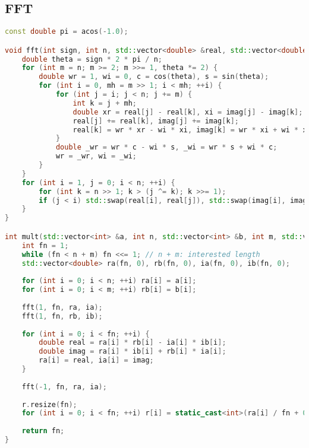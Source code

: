 \subsection{FFT}
    \begin{lstlisting}[language=c++]
const double pi = acos(-1.0);

void fft(int sign, int n, std::vector<double> &real, std::vector<double> &imag) {
    double theta = sign * 2 * pi / n;
    for (int m = n; m >= 2; m >>= 1, theta *= 2) {
        double wr = 1, wi = 0, c = cos(theta), s = sin(theta);
        for (int i = 0, mh = m >> 1; i < mh; ++i) {
            for (int j = i; j < n; j += m) {
                int k = j + mh;
                double xr = real[j] - real[k], xi = imag[j] - imag[k];
                real[j] += real[k], imag[j] += imag[k];
                real[k] = wr * xr - wi * xi, imag[k] = wr * xi + wi * xr;
            }
            double _wr = wr * c - wi * s, _wi = wr * s + wi * c;
            wr = _wr, wi = _wi;
        }
    }
    for (int i = 1, j = 0; i < n; ++i) {
        for (int k = n >> 1; k > (j ^= k); k >>= 1);
        if (j < i) std::swap(real[i], real[j]), std::swap(imag[i], imag[j]);
    }
}

int mult(std::vector<int> &a, int n, std::vector<int> &b, int m, std::vector<int> &r) {
    int fn = 1;
    while (fn < n + m) fn <<= 1; // n + m: interested length
    std::vector<double> ra(fn, 0), rb(fn, 0), ia(fn, 0), ib(fn, 0);
    
    for (int i = 0; i < n; ++i) ra[i] = a[i];
    for (int i = 0; i < m; ++i) rb[i] = b[i];
    
    fft(1, fn, ra, ia);
    fft(1, fn, rb, ib);
    
    for (int i = 0; i < fn; ++i) {
        double real = ra[i] * rb[i] - ia[i] * ib[i];
        double imag = ra[i] * ib[i] + rb[i] * ia[i];
        ra[i] = real, ia[i] = imag;
    }
    
    fft(-1, fn, ra, ia);
    
    r.resize(fn);
    for (int i = 0; i < fn; ++i) r[i] = static_cast<int>(ra[i] / fn + 0.5);
    
    return fn;
}
    \end{lstlisting}